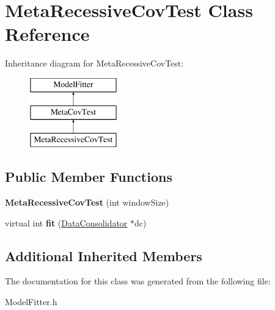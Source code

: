 \hypertarget{classMetaRecessiveCovTest}{\section{Meta\-Recessive\-Cov\-Test Class Reference}
\label{classMetaRecessiveCovTest}
}
Inheritance diagram for Meta\-Recessive\-Cov\-Test\-:\begin{figure}[H]
\begin{center}
\leavevmode
\includegraphics[height=3.000000cm]{classMetaRecessiveCovTest}
\end{center}
\end{figure}
\subsection*{Public Member Functions}
\begin{DoxyCompactItemize}
\item 
\hypertarget{classMetaRecessiveCovTest_aa10e966ebff6541531e03def7f8706aa}{{\bfseries Meta\-Recessive\-Cov\-Test} (int window\-Size)}\label{classMetaRecessiveCovTest_aa10e966ebff6541531e03def7f8706aa}

\item 
\hypertarget{classMetaRecessiveCovTest_a7378e98f9f7305ea75778c0f4d7c618d}{virtual int {\bfseries fit} (\hyperlink{classDataConsolidator}{Data\-Consolidator} $\ast$dc)}\label{classMetaRecessiveCovTest_a7378e98f9f7305ea75778c0f4d7c618d}

\end{DoxyCompactItemize}
\subsection*{Additional Inherited Members}


The documentation for this class was generated from the following file\-:\begin{DoxyCompactItemize}
\item 
Model\-Fitter.\-h\end{DoxyCompactItemize}
